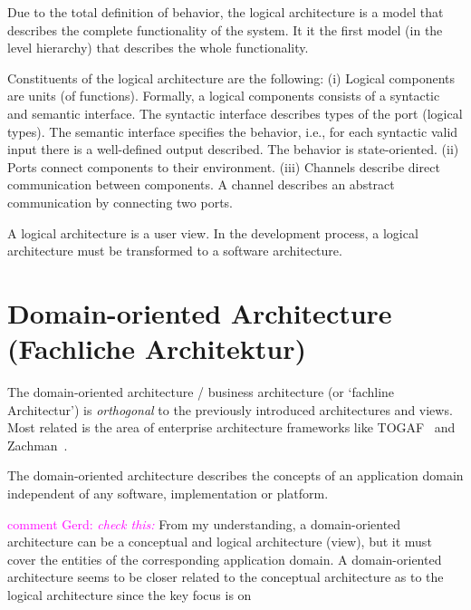 \documentclass{llncs} %
\newcommand{\ggr}[1]{\textcolor{magenta}{comment Gerd: \textit{#1}}}
\begin{document}
Due to the total definition of behavior, the logical architecture is a model that describes
the complete functionality of the system. It it the first model (in the level hierarchy) 
that describes the whole functionality.  

Constituents of the logical architecture are the following:
(i) Logical components are units (of functions).
	Formally, a logical components consists of a syntactic and semantic interface. The syntactic interface
	describes types of the port (logical types). The semantic interface specifies the behavior, i.e., for
	each syntactic valid input there is a well-defined output described. The behavior is state-oriented.
(ii) Ports connect components to their environment.
(iii) Channels describe direct communication between components. A channel describes an abstract
communication by connecting two ports.
	



A logical architecture is a user view. In the development process, a logical architecture
must be transformed to a software architecture.

\section{Domain-oriented Architecture (Fachliche Architektur)}

The domain-oriented architecture / business architecture (or `fachline Architectur')
is \emph{orthogonal} to the previously introduced architectures and views.
Most related is the area of enterprise architecture frameworks like TOGAF~\cite{togaf91}
and Zachman~\cite{Zachman1987AFF}.

The domain-oriented architecture describes the concepts of an application domain
independent of any software, implementation or platform.

\ggr{check this:} From my understanding, a domain-oriented architecture
can be a conceptual and logical architecture (view),
but it must cover the entities of the corresponding application domain.
A domain-oriented architecture seems to be closer related to the conceptual architecture
as to the logical architecture since the key focus is on
\end{document}
